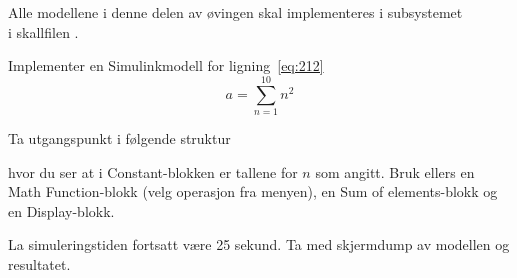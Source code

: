 
\item[]   Alle modellene i denne delen av øvingen skal implementeres
  i subsystemet\\
   i 
  skallfilen .



\item[m)]
  Implementer en Simulinkmodell for ligning~\eqref{eq:212}
  \begin{equation}
     a = \sum_{n=1}^{10}n^{2}     \label{eq:212}
   \end{equation}

   Ta utgangspunkt i følgende struktur
     \begin{figure}[H]
    \centering
    \hspace*{0mm}
  \end{figure}
  hvor du ser at i {\sf  Constant}-blokken er 
   tallene for $n$ som  angitt.
   Bruk ellers en {\sf  Math Function}-blokk (velg operasjon fra
   menyen),  en {\sf  Sum of  elements}-blokk og en {\sf 
     Display}-blokk.

   {\color{red}La simuleringstiden fortsatt være  25 sekund.}
Ta med skjermdump av modellen og resultatet.
   
